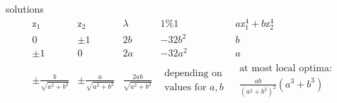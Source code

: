 \documentclass[a4paper,11pt]{article}
\begin{document}
solutions
\[ \begin{array}{c|c|c|c|c}
	\mathrm{z}_1 & \mathrm{z}_2 & \lambda & 1 \% 1 
		& a\mathrm{z}^4_1 + b\mathrm{z}^4_2 \\
	\hline 
	0 & \pm 1 & 2b & -32b^2 & b \\
	\pm 1 & 0 & 2a & -32a^2 & a \\
	\pm \frac{b}{\sqrt{a^2 + b^2}} & \pm \frac{a}{\sqrt{a^2 + b^2}}
		& \frac{2ab}{\sqrt{a^2 + b^2}}
		& \substack{\text{depending on} \\ \text{values for }a,b}
		& \substack{\text{at most local optima:} \\
			\frac{ab}{(a^2+b^2)^2} (a^3+b^3)}
\end{array}\]
\end{document}
